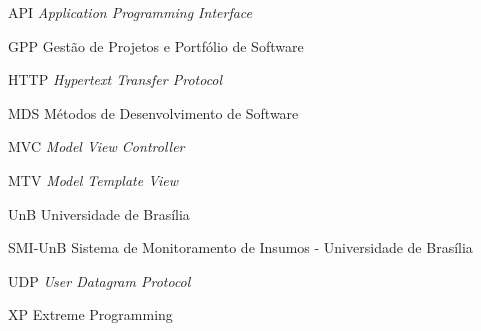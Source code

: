 \begin{siglas}
  \item[API] \textit{Application Programming Interface}
  \item[GPP] Gestão de Projetos e Portfólio de Software
  \item[HTTP] \textit{Hypertext Transfer Protocol}
  \item[MDS] Métodos de Desenvolvimento de Software
  \item[MVC] \textit{Model View Controller}
  \item[MTV] \textit{Model Template View}
  \item[UnB] Universidade de Brasília
  \item[SMI-UnB] Sistema de Monitoramento de Insumos - Universidade de Brasília
  \item[UDP] \textit{User Datagram Protocol}
  \item[XP] Extreme Programming
\end{siglas}